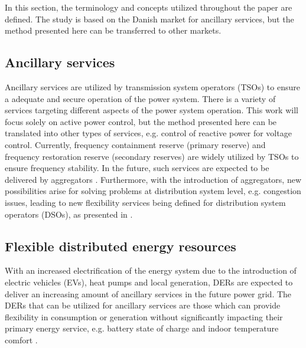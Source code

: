 In this section, the terminology and concepts utilized throughout the paper are defined. The study is based on the Danish market for ancillary services, but the method presented here can be transferred to other markets.  

\subsection{Ancillary services}
Ancillary services are utilized by transmission system operators (TSOs) to ensure a adequate and secure operation of the power system. There is a variety of services targeting different aspects of the power system operation. This work will focus solely on active power control, but the method presented here can be translated into other types of services, e.g. control of reactive power for voltage control. Currently, frequency containment reserve (primary reserve) and frequency restoration reserve (secondary reserves) \cite{entso1operational} are widely utilized by TSOs to ensure frequency stability. In the future, such services are expected to be delivered by aggregators \cite{pudjianto2007virtual,vrettos2015frequency}. Furthermore, with the introduction of aggregators, new possibilities arise for solving problems at distribution system level, e.g. congestion issues, leading to new flexibility services being defined for distribution system operators (DSOs), as presented in \cite{ding2013development}. %

\subsection{Flexible distributed energy resources}\label{sec:DERs}
With an increased electrification of the energy system due to the introduction of electric vehicles (EVs), heat pumps and local generation, DERs are expected to deliver an increasing amount of ancillary services in the future power grid. The DERs that can be utilized for ancillary services are those which can provide flexibility in consumption or generation without significantly impacting their primary energy service, e.g. battery state of charge and indoor temperature comfort \cite{costanzo2013coordination,halvgaard2012economic}.

